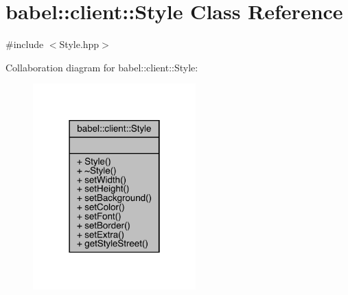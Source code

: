 \hypertarget{classbabel_1_1client_1_1_style}{}\section{babel\+:\+:client\+:\+:Style Class Reference}
\label{classbabel_1_1client_1_1_style}


{\ttfamily \#include $<$Style.\+hpp$>$}



Collaboration diagram for babel\+:\+:client\+:\+:Style\+:\nopagebreak
\begin{figure}[H]
\begin{center}
\leavevmode
\includegraphics[width=178pt]{classbabel_1_1client_1_1_style__coll__graph}
\end{center}
\end{figure}
